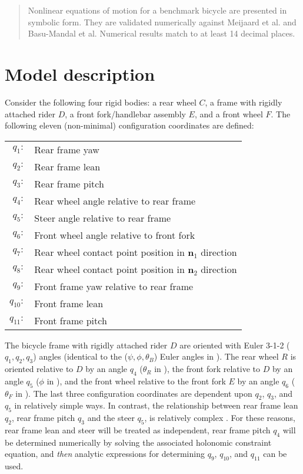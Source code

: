 \documentclass[letterpaper,11pt]{article}
\newcommand{\bs}[1]{ \boldsymbol{ #1 } }
\begin{document}
\begin{abstract}

  Nonlinear equations of motion for a benchmark bicycle are presented in
  symbolic form.  They are validated numerically against Meijaard et al. and
  Basu-Mandal et al.  Numerical results match to at least 14 decimal places.

\end{abstract}

\section*{Model description}
Consider the following four rigid bodies: a rear wheel $C$, a frame with
rigidly attached rider $D$, a front fork/handlebar assembly $E$, and a front
wheel $F$.
The following eleven (non-minimal) configuration coordinates are defined:
\begin{table}[h]
  \begin{center}
    \begin{tabular}{rl}
      $q_1:$ & Rear frame yaw \\
      $q_2:$ & Rear frame lean \\
      $q_3:$ & Rear frame pitch \\
      $q_4:$ & Rear wheel angle relative to rear frame \\
      $q_5:$ & Steer angle relative to rear frame \\
      $q_6:$ & Front wheel angle relative to front fork \\
      $q_7:$ & Rear wheel contact point position in $\bs{n}_1$ direction \\
      $q_8:$ & Rear wheel contact point position in $\bs{n}_2$ direction \\
      $q_9:$ & Front frame yaw relative to rear frame \\
      $q_{10}:$ & Front frame lean \\
      $q_{11}:$ & Front frame pitch
    \end{tabular}
  \end{center}
\end{table}

The bicycle frame with rigidly attached rider $D$ are oriented with Euler 3-1-2
($q_1, q_2, q_3$) angles (identical to the ($\psi, \phi, \theta_B$) Euler
angles in \cite{Meijaard2007}).  The rear wheel $R$ is oriented relative to $D$
by an angle $q_4$ ($\theta_R$ in \cite{Meijaard2007}), the front fork relative
to $D$ by an angle $q_5$ ($\phi$ in \cite{Meijaard2007}), and the front wheel
relative to the front fork $E$ by an angle $q_6$ ($\theta_F$ in
\cite{Meijaard2007}).  The last three configuration coordinates are dependent
upon $q_2$, $q_3$, and $q_5$ in relatively simple ways.  In contrast, the
relationship between rear frame lean $q_2$, rear frame pitch $q_3$ and the
steer $q_5$, is relatively complex \cite{Peterson2008a}.  For these reasons,
rear frame lean and steer will be treated as independent, rear frame pitch
$q_4$ will be determined numerically by solving the associated holonomic
constraint equation, and {\it{then}} analytic expressions for determining
$q_9$, $q_{10}$, and $q_{11}$ can be used.
\end{document}
